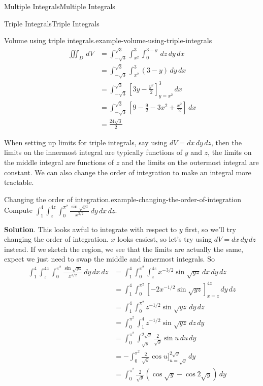 \documentclass[10pt,]{book}
\numberwithin{equation}{section}
\begin{document}
\begin{chapterptx}{Multiple Integrals}{}{Multiple Integrals}{}{}
\begin{sectionptx}{Triple Integrals}{}{Triple Integrals}{}{}
\begin{example}{Volume using triple integrals.}{example-volume-using-triple-integrals}
\begin{align*}
\iiint_{D}\,dV & = \int_{-\sqrt{3}}^{\sqrt{3}}\int_{x^{2}}^{3}\int_{0}^{3-y}\,dz\,dy\,dx \\
& = \int_{-\sqrt{3}}^{\sqrt{3}}\int_{x^{2}}^{3} (3-y)\,dy\,dx \\
& = \int_{-\sqrt{3}}^{\sqrt{3}}\left[3y-\frac{y^{2}}{2}\right]_{y=x^{2}}^{3}\,dx \\
& = \int_{-\sqrt{3}}^{\sqrt{3}}\left[9 - \frac{9}{2} - 3x^{2} + \frac{x^{2}}{2}\right]\,dx \\
& = \frac{24\sqrt{3}}{2} 
\end{align*}
%
\end{example}
\hypertarget{p-1299}{}%
When setting up limits for triple integrals, say using \(dV = dx\,dy\,dz\), then the limits on the innermost integral are typically functions of \(y\) and \(z\), the limits on the middle integral are functions of \(z\) and the limits on the outermost integral are constant. We can also change the order of integration to make an integral more tractable.%
\begin{example}{Changing the order of integration.}{example-changing-the-order-of-integration}%
\hypertarget{p-1300}{}%
Compute \(\int_{1}^{4}\int_{z}^{4z}\int_{0}^{\pi^{2}}\frac{\sin\sqrt{yz}}{x^{3/2}}\,dy\,dx\,dz\).%
\par\smallskip%
\noindent\textbf{Solution}.\hypertarget{solution-209}{}\quad%
\hypertarget{p-1301}{}%
This looks awful to integrate with respect to \(y\) first, so we'll try changing the order of integration. \(x\) looks easiest, so let's try using \(dV = dx\,dy\,dz\) instead. If we sketch the region, we see that the limits are actually the same, expect we just need to swap the middle and innermost integrals. So%
\begin{align*}
\int_{1}^{4}\int_{z}^{4z}\int_{0}^{\pi^{2}}\frac{\sin\sqrt{yz}}{x^{3/2}}\,dy\,dx\,dz  & = \int_{1}^{4}\int_{0}^{\pi^{2}}\int_{z}^{4z}x^{-3/2}\sin\sqrt{yz}\,dx\,dy\,dz \\
& = \int_{1}^{4}\int_{0}^{\pi^{2}}\left[-2x^{-1/2}\sin\sqrt{yz}\right]_{x=z}^{4z}\,dy\,dz \\
& = \int_{1}^{4}\int_{0}^{\pi^{2}}z^{-1/2}\sin\sqrt{yz}\,dy\,dz \\
& = \int_{0}^{\pi^{2}}\int_{1}^{4}z^{-1/2}\sin\sqrt{yz}\,dz\,dy \\
& = \int_{0}^{\pi^{2}}\int_{\sqrt{y}}^{2\sqrt{y}}\frac{2}{\sqrt{y}}\sin u\,du\,dy \\
& = -\int_{0}^{\pi^{2}}\frac{2}{\sqrt{y}}\cos u\bigg]_{u=\sqrt{y}}^{2\sqrt{y}}\,dy \\
& = \int_{0}^{\pi^{2}}\frac{2}{\sqrt{y}}(\cos\sqrt{y} - \cos2\sqrt{y})\,dy \\

\end{align*}
\end{example}
\end{sectionptx}
\end{chapterptx}
\end{document}
